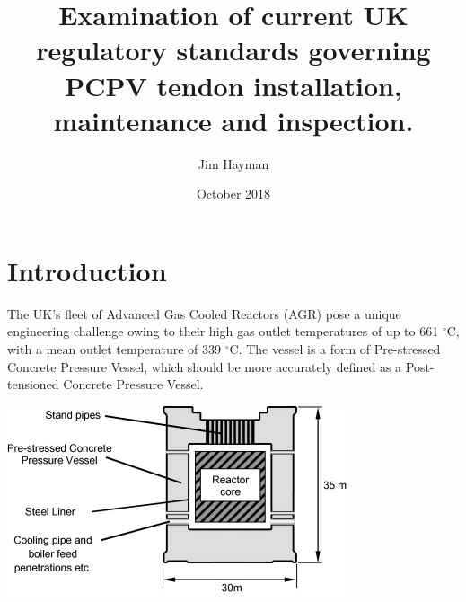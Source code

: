 \documentclass[twocolumn]{article}
\title{Examination of current UK regulatory standards governing PCPV tendon installation, maintenance and inspection.}
\author{Jim Hayman }
\date{October 2018}
\begin{document}
\maketitle

\section{Introduction}
The UK's fleet of Advanced Gas Cooled Reactors (AGR) pose a unique engineering challenge owing to their high gas outlet temperatures of up to 661 $^{\circ}$C, with a mean outlet temperature of 339 $^{\circ}$C. The vessel is a form of Pre-stressed Concrete Pressure Vessel, which should be more accurately defined as a Post-tensioned Concrete Pressure Vessel. 

\begin{center}
\includegraphics[width=0.8\columnwidth]{images/pcpvdrawing.png}
\end{center}
\end{document}
